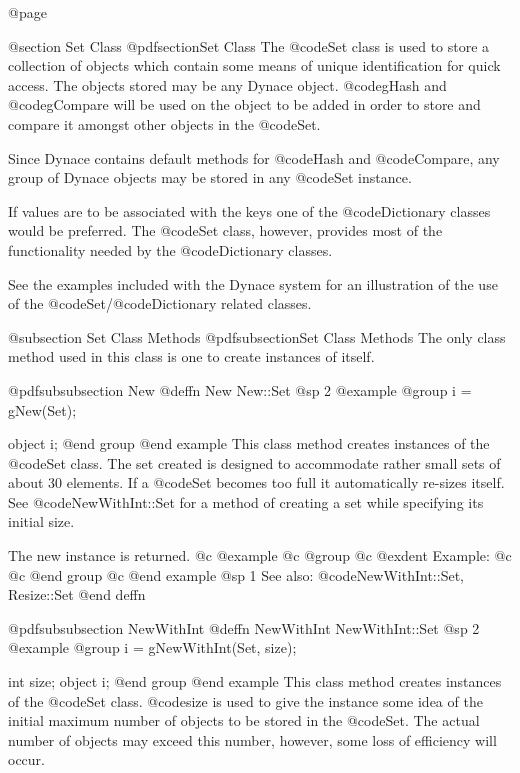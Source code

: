 @page

@section Set Class
@pdfsection{Set Class}
The @code{Set} class is used to store a collection of objects which
contain some means of unique identification for quick access.  The
objects stored may be any Dynace object.  @code{gHash} and
@code{gCompare} will be used on the object to be added in order to store
and compare it amongst other objects in the @code{Set}.

Since Dynace contains default methods for @code{Hash} and @code{Compare},
any group of Dynace objects may be stored in any @code{Set} instance.

If values are to be associated with the keys one of the @code{Dictionary}
classes would be preferred.  The @code{Set} class, however, provides
most of the functionality needed by the @code{Dictionary} classes.

See the examples included with the Dynace system for an illustration of the
use of the @code{Set}/@code{Dictionary} related classes.



@subsection Set Class Methods
@pdfsubsection{Set Class Methods}
The only class method used in this class is one to create instances of itself.




@pdfsubsubsection {New}
@deffn {New} New::Set
@sp 2
@example
@group
i = gNew(Set);

object  i;
@end group
@end example
This class method creates instances of the @code{Set} class.  The set
created is designed to accommodate rather small sets of about 30
elements.  If a @code{Set} becomes too full it automatically re-sizes
itself.  See @code{NewWithInt::Set} for a method of creating a set
while specifying its initial size.

The new instance is returned.
@c @example
@c @group
@c @exdent Example:
@c 
@c @end group
@c @end example
@sp 1
See also:  @code{NewWithInt::Set, Resize::Set}
@end deffn







@pdfsubsubsection {NewWithInt}
@deffn {NewWithInt} NewWithInt::Set
@sp 2
@example
@group
i = gNewWithInt(Set, size);

int     size;
object  i;
@end group
@end example
This class method creates instances of the @code{Set} class.
@code{size} is used to give the instance some idea of the initial maximum number
of objects to be stored in the @code{Set}.  The actual number of objects may
exceed this number, however, some loss of efficiency will occur.

